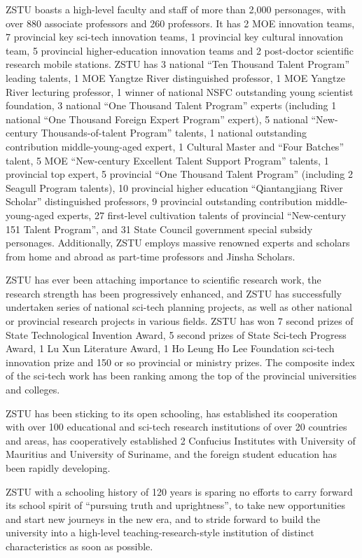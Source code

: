 \begin{englishabstract}
ZSTU boasts a high-level faculty and staff of more than 2,000 personages, with over 880 associate professors and 260 professors. It has 2 MOE innovation teams, 7 provincial key sci-tech innovation teams, 1 provincial key cultural innovation team, 5 provincial higher-education innovation teams and 2 post-doctor scientific research mobile stations. ZSTU has 3 national “Ten Thousand Talent Program” leading talents, 1 MOE Yangtze River distinguished professor, 1 MOE Yangtze River lecturing professor, 1 winner of national NSFC outstanding young scientist foundation, 3 national “One Thousand Talent Program” experts (including 1 national “One Thousand Foreign Expert Program” expert), 5 national “New-century Thousands-of-talent Program” talents, 1 national outstanding contribution middle-young-aged expert, 1 Cultural Master and “Four Batches” talent, 5 MOE “New-century Excellent Talent Support Program” talents, 1 provincial top expert, 5 provincial “One Thousand Talent Program” (including 2 Seagull Program talents), 10 provincial higher education “Qiantangjiang River Scholar” distinguished professors, 9 provincial outstanding contribution middle-young-aged experts, 27 first-level cultivation talents of provincial “New-century 151 Talent Program”, and 31 State Council government special subsidy personages. Additionally, ZSTU employs massive renowned experts and scholars from home and abroad as part-time professors and Jinsha Scholars.

ZSTU has ever been attaching importance to scientific research work, the research strength has been progressively enhanced, and ZSTU has successfully undertaken series of national sci-tech planning projects, as well as other national or provincial research projects in various fields. ZSTU has won 7 second prizes of State Technological Invention Award, 5 second prizes of State Sci-tech Progress Award, 1 Lu Xun Literature Award, 1 Ho Leung Ho Lee Foundation sci-tech innovation prize and 150 or so provincial or ministry prizes. The composite index of the sci-tech work has been ranking among the top of the provincial universities and colleges.

ZSTU has been sticking to its open schooling, has established its cooperation with over 100 educational and sci-tech research institutions of over 20 countries and areas, has cooperatively established 2 Confucius Institutes with University of Mauritius and University of Suriname, and the foreign student education has been rapidly developing.

ZSTU with a schooling history of 120 years is sparing no efforts to carry forward its school spirit of “pursuing truth and uprightness”, to take new opportunities and start new journeys in the new era, and to stride forward to build the university into a high-level teaching-research-style institution of distinct characteristics as soon as possible.

\end{englishabstract}

